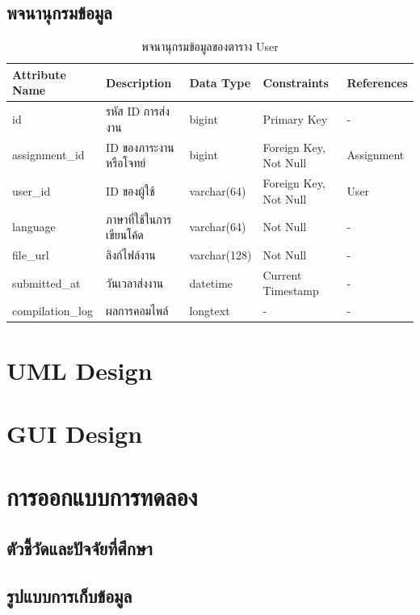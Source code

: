 \documentclass[12pt,oneside,openright,a4paper]{cpe-thai-project}
\begin{document}
    \subsection{พจนานุกรมข้อมูล}
        \begin{table}[!h]
            \centering
            \caption{พจนานุกรมข้อมูลของตาราง User}\label{tbl:data-dict-user}
            \begin{tabular}{p{2cm}|p{4cm}p{2cm}p{3cm}p{2cm}} \hline\hline
                Attribute Name & Description & Data Type & Constraints & References \\ \hline\hline
                id & รหัส ID การส่งงาน & bigint & Primary Key & - \\
                assignment\_id & ID ของภาระงานหรือโจทย์ & bigint & Foreign Key, Not Null & Assignment \\
                user\_id & ID ของผู้ใช้ & varchar(64) & Foreign Key, Not Null & User \\
                language & ภาษาที่ใช้ในการเขียนโค้ด & varchar(64) & Not Null & - \\
                file\_url & ลิงก์ไฟล์งาน & varchar(128) & Not Null & - \\
                submitted\_at & วันเวลาส่งงาน & datetime & Current Timestamp & - \\
                compilation\_log & ผลการคอมไพล์ & longtext & - & - \\ \hline\hline
        \end{tabular}   
    \end{table}

\section{UML Design}

\section{GUI Design}
    

\section{การออกแบบการทดลอง}
    \subsection{ตัวชี้วัดและปัจจัยที่ศึกษา}
    \subsection{รูปแบบการเก็บข้อมูล}
\end{document}
